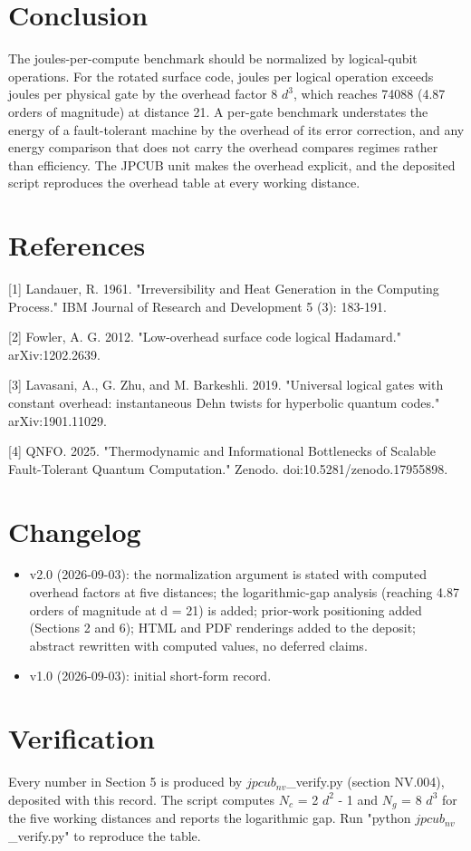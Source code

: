 \documentclass[11pt]{article}
\begin{document}
\section{Conclusion}
The joules-per-compute benchmark should be normalized by logical-qubit operations. For the rotated surface code, joules per logical operation exceeds joules per physical gate by the overhead factor 8 $d^{3}$, which reaches 74088 (4.87 orders of magnitude) at distance 21. A per-gate benchmark understates the energy of a fault-tolerant machine by the overhead of its error correction, and any energy comparison that does not carry the overhead compares regimes rather than efficiency. The JPCUB unit makes the overhead explicit, and the deposited script reproduces the overhead table at every working distance.

\section*{References}
[1] Landauer, R. 1961. "Irreversibility and Heat Generation in the Computing Process." IBM Journal of Research and Development 5 (3): 183-191.

[2] Fowler, A. G. 2012. "Low-overhead surface code logical Hadamard." arXiv:1202.2639.

[3] Lavasani, A., G. Zhu, and M. Barkeshli. 2019. "Universal logical gates with constant overhead: instantaneous Dehn twists for hyperbolic quantum codes." arXiv:1901.11029.

[4] QNFO. 2025. "Thermodynamic and Informational Bottlenecks of Scalable Fault-Tolerant Quantum Computation." Zenodo. doi:10.5281/zenodo.17955898.

\section*{Changelog}
\begin{itemize}
  \item v2.0 (2026-09-03): the normalization argument is stated with computed overhead factors at five distances; the logarithmic-gap analysis (reaching 4.87 orders of magnitude at d = 21) is added; prior-work positioning added (Sections 2 and 6); HTML and PDF renderings added to the deposit; abstract rewritten with computed values, no deferred claims.
  \item v1.0 (2026-09-03): initial short-form record.
\end{itemize}
\section*{Verification}
Every number in Section 5 is produced by $jpcub_{nv}$\_verify.py (section NV.004), deposited with this record. The script computes $N_{c}$ = 2 $d^{2}$ - 1 and $N_{g}$ = 8 $d^{3}$ for the five working distances and reports the logarithmic gap. Run "python $jpcub_{nv}$\_verify.py" to reproduce the table.
\end{document}
